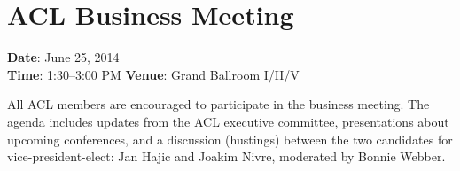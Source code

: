 \section[ACL Business Meeting]{ACL Business Meeting}
\thispagestyle{emptyheader}

\textbf{Date}: June 25, 2014 \\
\textbf{Time}: 1:30--3:00 PM
\textbf{Venue}: Grand Ballroom I/II/V

All ACL members are encouraged to participate in the business
meeting. The agenda includes updates from the ACL executive committee,
presentations about upcoming conferences, and a discussion
(hustings) between the two candidates for vice-president-elect: Jan
Hajic and Joakim Nivre, moderated by Bonnie Webber.

